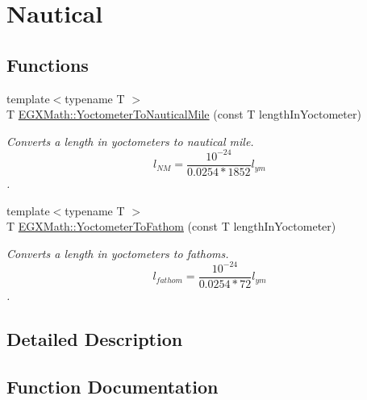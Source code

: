 \hypertarget{group___e_g_x_math-_conversions-_length_conversions-_s_i-_yoctometer-_nautical}{}\section{Nautical}
\label{group___e_g_x_math-_conversions-_length_conversions-_s_i-_yoctometer-_nautical}
\subsection*{Functions}
\begin{DoxyCompactItemize}
\item 
{\footnotesize template$<$typename T $>$ }\\T \mbox{\hyperlink{group___e_g_x_math-_conversions-_length_conversions-_s_i-_yoctometer-_nautical_gae49dab08f77667adbef6d419339a54c0}{E\+G\+X\+Math\+::\+Yoctometer\+To\+Nautical\+Mile}} (const T length\+In\+Yoctometer)
\begin{DoxyCompactList}\small\item\em Converts a length in yoctometers to nautical mile. \[ l_{NM}= \frac{10^{-24}}{0.0254 * 1852} l_{ym} \]. \end{DoxyCompactList}\item 
{\footnotesize template$<$typename T $>$ }\\T \mbox{\hyperlink{group___e_g_x_math-_conversions-_length_conversions-_s_i-_yoctometer-_nautical_gae0ed365ad4fa316377b2054b86012240}{E\+G\+X\+Math\+::\+Yoctometer\+To\+Fathom}} (const T length\+In\+Yoctometer)
\begin{DoxyCompactList}\small\item\em Converts a length in yoctometers to fathoms. \[ l_{fathom}= \frac{10^{-24}}{0.0254 * 72} l_{ym} \]. \end{DoxyCompactList}\end{DoxyCompactItemize}


\subsection{Detailed Description}


\subsection{Function Documentation}
\mbox{\label{group___e_g_x_math-_conversions-_length_conversions-_s_i-_yoctometer-_nautical_gae0ed365ad4fa316377b2054b86012240}} 
